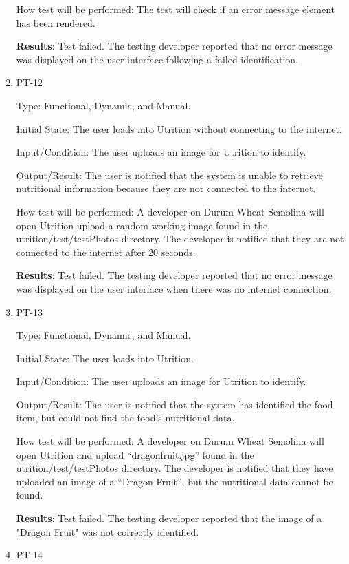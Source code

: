 \documentclass[12pt, titlepage]{article}
\begin{document}
\begin{enumerate}
		How test will be performed: The test will check if an error message element has been rendered.
		
		\textbf{Results}: Test failed. The testing developer reported that no error message was displayed on the user interface following a failed identification.
		
		\item{PT-12}
		
		Type: Functional, Dynamic, and Manual.
		
		Initial State: The user loads into Utrition without connecting to the internet.
		
		Input/Condition: The user uploads an image for Utrition to identify.
		
		Output/Result: The user is notified that the system is unable to retrieve nutritional information because they are not connected to the internet.
		
		How test will be performed: A developer on Durum Wheat Semolina will open Utrition upload a random working image found in the utrition/test/testPhotos directory. The developer is notified that they are not connected to the internet after 20 seconds.
		
		\textbf{Results}: Test failed. The testing developer reported that no error message was displayed on the user interface when there was no internet connection. 
		
		\item{PT-13} 
		
		Type: Functional, Dynamic, and Manual.
		
		Initial State: The user loads into Utrition.
		
		Input/Condition: The user uploads an image for Utrition to identify.
		
		Output/Result: The user is notified that the system has identified the food item, but could not find the food’s nutritional data.
		
		How test will be performed: A developer on Durum Wheat Semolina will open Utrition and upload “dragonfruit.jpg” found in the utrition/test/testPhotos directory. The developer is notified that they have uploaded an image of a “Dragon Fruit”, but the nutritional data cannot be found.
		
		\textbf{Results}: Test failed. The testing developer reported that the image of a "Dragon Fruit" was not correctly identified.
		
		\item{PT-14} 
		

\end{enumerate}
\end{document}
